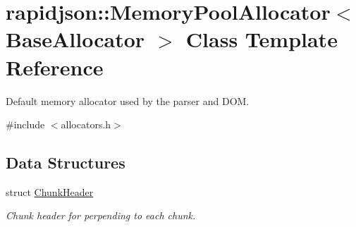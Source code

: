 \hypertarget{classrapidjson_1_1_memory_pool_allocator}{}\section{rapidjson\+::Memory\+Pool\+Allocator$<$ Base\+Allocator $>$ Class Template Reference}
\label{classrapidjson_1_1_memory_pool_allocator}


Default memory allocator used by the parser and D\+OM.  




{\ttfamily \#include $<$allocators.\+h$>$}

\subsection*{Data Structures}
\begin{DoxyCompactItemize}
\item 
struct \mbox{\hyperlink{structrapidjson_1_1_memory_pool_allocator_1_1_chunk_header}{Chunk\+Header}}
\begin{DoxyCompactList}\small\item\em Chunk header for perpending to each chunk. \end{DoxyCompactList}\end{DoxyCompactItemize}
